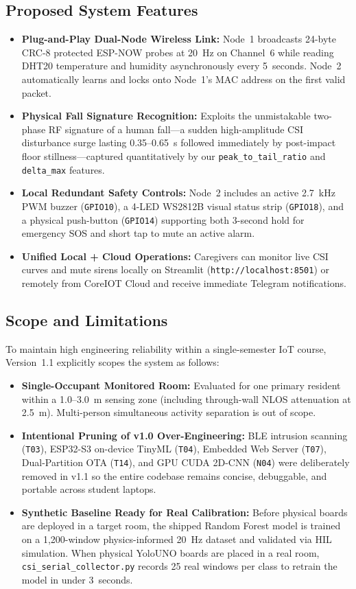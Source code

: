 \documentclass{hcmut-report}
\begin{document}
\subsection{Proposed System Features}
\begin{itemize}
  \item \textbf{Plug-and-Play Dual-Node Wireless Link:} Node~1 broadcasts 24-byte CRC-8 protected ESP-NOW probes at 20~Hz on Channel~6 while reading DHT20 temperature and humidity asynchronously every 5~seconds. Node~2 automatically learns and locks onto Node~1's MAC address on the first valid packet.
  \item \textbf{Physical Fall Signature Recognition:} Exploits the unmistakable two-phase RF signature of a human fall—a sudden high-amplitude CSI disturbance surge lasting 0.35--0.65~s followed immediately by post-impact floor stillness—captured quantitatively by our \texttt{peak\_to\_tail\_ratio} and \texttt{delta\_max} features.
  \item \textbf{Local Redundant Safety Controls:} Node~2 includes an active 2.7~kHz PWM buzzer (\texttt{GPIO10}), a 4-LED WS2812B visual status strip (\texttt{GPIO18}), and a physical push-button (\texttt{GPIO14}) supporting both 3-second hold for emergency SOS and short tap to mute an active alarm.
  \item \textbf{Unified Local + Cloud Operations:} Caregivers can monitor live CSI curves and mute sirens locally on Streamlit (\texttt{http://localhost:8501}) or remotely from CoreIOT Cloud and receive immediate Telegram notifications.
\end{itemize}

\subsection{Scope and Limitations}
To maintain high engineering reliability within a single-semester IoT course, Version~1.1 explicitly scopes the system as follows:
\begin{itemize}
  \item \textbf{Single-Occupant Monitored Room:} Evaluated for one primary resident within a 1.0--3.0~m sensing zone (including through-wall NLOS attenuation at 2.5~m). Multi-person simultaneous activity separation is out of scope.
  \item \textbf{Intentional Pruning of v1.0 Over-Engineering:} BLE intrusion scanning (\texttt{T03}), ESP32-S3 on-device TinyML (\texttt{T04}), Embedded Web Server (\texttt{T07}), Dual-Partition OTA (\texttt{T14}), and GPU CUDA 2D-CNN (\texttt{N04}) were deliberately removed in v1.1 so the entire codebase remains concise, debuggable, and portable across student laptops.
  \item \textbf{Synthetic Baseline Ready for Real Calibration:} Before physical boards are deployed in a target room, the shipped Random Forest model is trained on a 1,200-window physics-informed 20~Hz dataset and validated via HIL simulation. When physical YoloUNO boards are placed in a real room, \texttt{csi\_serial\_collector.py} records 25 real windows per class to retrain the model in under 3~seconds.
\end{itemize}
\end{document}
